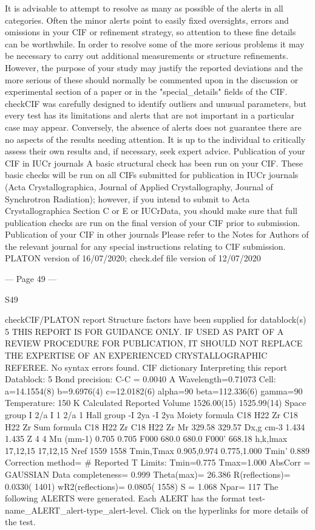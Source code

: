 It is advisable to attempt to resolve as many as possible of the alerts in all categories. Often the
minor alerts point to easily fixed oversights, errors and omissions in your CIF or refinement
strategy, so attention to these fine details can be worthwhile. In order to resolve some of the more
serious problems it may be necessary to carry out additional measurements or structure
refinements. However, the purpose of your study may justify the reported deviations and the more
serious of these should normally be commented upon in the discussion or experimental section of a
paper or in the "special_details" fields of the CIF. checkCIF was carefully designed to identify
outliers and unusual parameters, but every test has its limitations and alerts that are not important
in a particular case may appear. Conversely, the absence of alerts does not guarantee there are no
aspects of the results needing attention. It is up to the individual to critically assess their own
results and, if necessary, seek expert advice.
Publication of your CIF in IUCr journals 
A basic structural check has been run on your CIF. These basic checks will be run on all CIFs
submitted for publication in IUCr journals (Acta Crystallographica, Journal of Applied 
Crystallography, Journal of Synchrotron Radiation); however, if you intend to submit to Acta
Crystallographica Section C or E or IUCrData, you should make sure that full publication checks
are run on the final version of your CIF prior to submission.
Publication of your CIF in other journals 
Please refer to the Notes for Authors of the relevant journal for any special instructions relating to
CIF submission.
PLATON version of 16/07/2020; check.def file version of 12/07/2020 


--- Page 49 ---
 
 
S49 
 
 
 
checkCIF/PLATON report 
Structure factors have been supplied for datablock(s) 5
THIS REPORT IS FOR GUIDANCE ONLY. IF USED AS PART OF A REVIEW PROCEDURE
FOR PUBLICATION, IT SHOULD NOT REPLACE THE EXPERTISE OF AN EXPERIENCED
CRYSTALLOGRAPHIC REFEREE.
No syntax errors found.        CIF dictionary        Interpreting this report
Datablock: 5 
Bond precision:
C-C = 0.0040 A
Wavelength=0.71073
Cell:
a=14.1554(8)
b=9.6976(4)
c=12.0182(6)
alpha=90
beta=112.336(6)
gamma=90
Temperature: 
150 K
Calculated
Reported
Volume
1526.00(15)
1525.99(14)
Space group
I 2/a 
I 1 2/a 1 
Hall group
-I 2ya 
-I 2ya 
Moiety formula
C18 H22 Zr
C18 H22 Zr
Sum formula
C18 H22 Zr
C18 H22 Zr
Mr
329.58
329.57
Dx,g cm-3
1.434
1.435
Z
4
4
Mu (mm-1)
0.705
0.705
F000
680.0
680.0
F000’
668.18
h,k,lmax
17,12,15
17,12,15
Nref
1559 
1558 
Tmin,Tmax
0.905,0.974
0.775,1.000
Tmin’
0.889
Correction method= # Reported T Limits: Tmin=0.775 Tmax=1.000
AbsCorr = GAUSSIAN
Data completeness= 0.999
Theta(max)= 26.386
R(reflections)= 0.0330( 1401)
wR2(reflections)= 0.0805( 1558)
S = 1.068
Npar= 117
The following ALERTS were generated. Each ALERT has the format
       test-name_ALERT_alert-type_alert-level.
Click on the hyperlinks for more details of the test.


